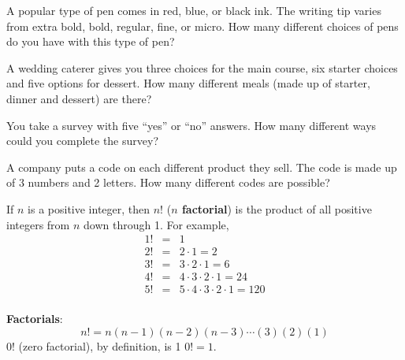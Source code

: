 \begin{ex} 
A popular type of pen comes in red, blue, or black ink.  The writing tip varies from extra bold, bold, regular, fine, or micro.  How many different choices of pens do you have with this type of pen?
\end{ex}
\vfill

\begin{ex}
A wedding caterer gives you three choices for the main course, six starter choices and five options for dessert. How many different meals (made up of starter, dinner and dessert) are there?
\end{ex}
\vfill

\begin{ex}
You take a survey with five ``yes'' or ``no'' answers. How many different ways could you complete the survey?
\end{ex}
\vfill
\begin{ex}
A company puts a code on each different product they sell. The code is made up of 3 numbers and 2 letters. How many different codes are possible?
\end{ex}
\vfill
\pagebreak

If $n$ is a positive integer, then $n!$ ({\bf $n$ factorial}) is the product of all positive integers from $n$ down through 1. For example,
	\[
	\begin{array}{ccl}
	1! & = & 1\\
	2! & = & 2 \cdot 1 = 2 \\
	3! & = & 3 \cdot 2 \cdot 1  = 6\\
	4! & = & 4\cdot 3 \cdot 2 \cdot 1 = 24\\
	5! & = & 5 \cdot 4\cdot 3 \cdot 2 \cdot 1=120\\
	\end{array}
	\]	
	
\begin{tcolorbox}[enhanced,width=6.5in,center upper,size=fbox,drop shadow southwest,sharp corners]
{\bf Factorials}: %
$$\displaystyle n!=n(n-1)(n-2)(n-3)\cdots (3)(2)(1)$$   
0! (zero factorial), by definition, is 1 $0!=1.$	
\end{tcolorbox}

